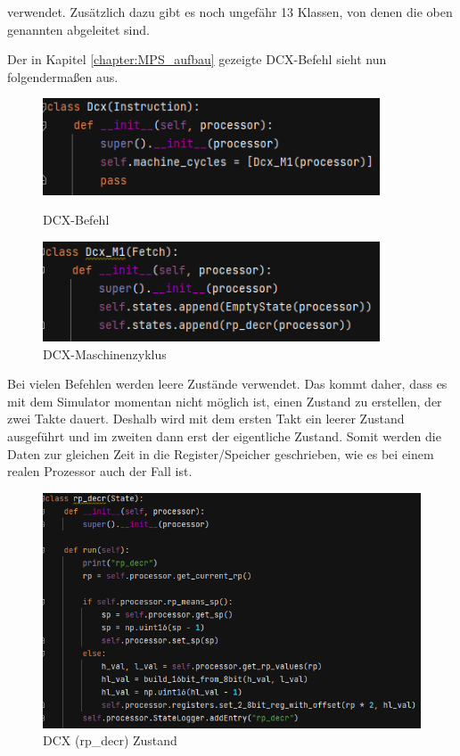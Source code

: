 \documentclass[12pt]{article}
\newcommand{\imgSpaceBefore}{\vspace{10pt}}
\begin{document}
\noindent
verwendet. Zusätzlich dazu gibt es noch ungefähr 13 Klassen, von denen die oben genannten abgeleitet sind.

\noindent
Der in Kapitel \ref{chapter:MPS_aufbau} gezeigte DCX-Befehl sieht nun folgendermaßen aus.

\imgSpaceBefore
\begin{figure}[H]
\centering
\includegraphics[width=10cm]{bilder/dcx_inst}
\caption{DCX-Befehl}
\vspace{15pt}
\includegraphics[width=10cm]{bilder/dcx_mc}
\caption{DCX-Maschinenzyklus}
\label{fig:Dcx_instr}
\end{figure}

\noindent
Bei vielen Befehlen werden leere Zustände verwendet. Das kommt daher, dass es mit dem Simulator momentan nicht möglich ist, einen Zustand zu erstellen, der zwei Takte dauert. Deshalb wird mit dem ersten Takt ein leerer Zustand ausgeführt und im zweiten dann erst der eigentliche Zustand. Somit werden die Daten zur gleichen Zeit in die Register/Speicher geschrieben, wie es bei einem realen Prozessor auch der Fall ist.

\imgSpaceBefore
\begin{figure}[H]
\centering
\includegraphics[width=14cm]{bilder/dcx_state}
\caption{DCX (rp\_decr) Zustand}
\label{fig:Dcx_state}
\end{figure}
\end{document}

